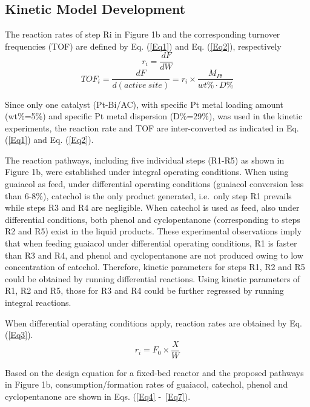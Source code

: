\documentclass[journal=iecred,manuscript=article]{achemso}
\begin{document}
\subsection{Kinetic Model Development}
The reaction rates of step Ri in Figure 1b
and the corresponding turnover frequencies (TOF) are defined by Eq. (\ref{Eq1}) and Eq. (\ref{Eq2}), respectively
\begin{equation} \label{Eq1}
r_i=\frac{dF}{dW}
\end{equation}
\begin{equation} \label{Eq2}
TOF_i=\frac{dF}{d\left(active~site\right)}=r_i \times \frac{M_{Pt}}{wt\% \cdot D\%}
\end{equation}

Since only one catalyst (Pt-Bi/AC), with specific Pt metal loading amount (wt\%=5\%) and specific Pt metal dispersion (D\%=29\%), was used in the kinetic experiments,
the reaction rate and TOF are inter-converted
as indicated in Eq. (\ref{Eq1}) and Eq. (\ref{Eq2}).

The reaction pathways, including five individual steps (R1-R5) as shown in Figure 1b,
were established under integral operating conditions.
When using guaiacol as feed, under differential operating conditions
(guaiacol conversion less than 6-8\%),
catechol is the only product generated, i.e.\ only step R1 prevails
while steps R3 and R4 are negligible. 
When catechol is used as feed,
also under differential conditions, both phenol and cyclopentanone (corresponding to steps R2 and R5) exist in the liquid products.
These experimental observations imply that when feeding guaiacol under differential operating conditions,
R1 is faster than R3 and R4, and phenol and cyclopentanone are not produced owing to low concentration of catechol.
Therefore, kinetic parameters for steps R1, R2 and R5 could be obtained by running differential reactions.
Using kinetic parameters of R1, R2 and R5,
those for R3 and R4 could be further regressed by running integral reactions.

When differential operating conditions apply, reaction rates are obtained by Eq. (\ref{Eq3}).
\begin{equation} \label{Eq3}
r_i=F_{0} \times \frac{X}{W}
\end{equation}

Based on the design equation for a fixed-bed reactor and the proposed pathways in Figure 1b, 
consumption/formation rates of guaiacol, catechol, phenol and cyclopentanone are shown in Eqs. (\ref{Eq4} -~\ref{Eq7}).
\end{document}
